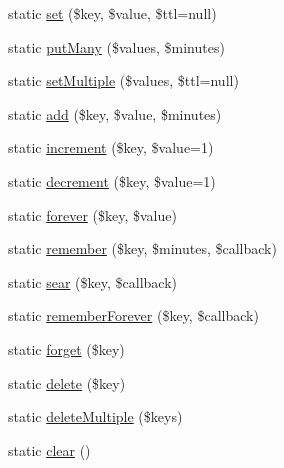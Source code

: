 \begin{DoxyCompactItemize}
\item 
static \mbox{\hyperlink{class_illuminate_1_1_support_1_1_facades_1_1_cache_aae56ae54487230d52f542ccc1e44b9e0}{set}} (\$key, \$value, \$ttl=null)
\item 
static \mbox{\hyperlink{class_illuminate_1_1_support_1_1_facades_1_1_cache_a2e11599beb3fba7bafc407cdf87b0465}{put\+Many}} (\$values, \$minutes)
\item 
static \mbox{\hyperlink{class_illuminate_1_1_support_1_1_facades_1_1_cache_ae003e01cbfd273316452592dac9899cc}{set\+Multiple}} (\$values, \$ttl=null)
\item 
static \mbox{\hyperlink{class_illuminate_1_1_support_1_1_facades_1_1_cache_a5d3c1ec6a3f551739e6c3b360e48e938}{add}} (\$key, \$value, \$minutes)
\item 
static \mbox{\hyperlink{class_illuminate_1_1_support_1_1_facades_1_1_cache_ac922e6a2e98d1e8b294dc4d3988868b8}{increment}} (\$key, \$value=1)
\item 
static \mbox{\hyperlink{class_illuminate_1_1_support_1_1_facades_1_1_cache_a19a2ac21616577006738d270ebf66d1b}{decrement}} (\$key, \$value=1)
\item 
static \mbox{\hyperlink{class_illuminate_1_1_support_1_1_facades_1_1_cache_ad5857aecf260156120fb7cf288c0ae24}{forever}} (\$key, \$value)
\item 
static \mbox{\hyperlink{class_illuminate_1_1_support_1_1_facades_1_1_cache_aaa1f933dcd2732482b7818feb648fb5c}{remember}} (\$key, \$minutes, \$callback)
\item 
static \mbox{\hyperlink{class_illuminate_1_1_support_1_1_facades_1_1_cache_a2cd54fc860d738ed8388d33ee8bd05d4}{sear}} (\$key, \$callback)
\item 
static \mbox{\hyperlink{class_illuminate_1_1_support_1_1_facades_1_1_cache_a2e979a52ee4fdab7288c423516151a7a}{remember\+Forever}} (\$key, \$callback)
\item 
static \mbox{\hyperlink{class_illuminate_1_1_support_1_1_facades_1_1_cache_a95df8d5b2309d9b776fd3572273730b0}{forget}} (\$key)
\item 
static \mbox{\hyperlink{class_illuminate_1_1_support_1_1_facades_1_1_cache_a6a8c952c13ec741d6ce668652c9d42f9}{delete}} (\$key)
\item 
static \mbox{\hyperlink{class_illuminate_1_1_support_1_1_facades_1_1_cache_a9fbf5c08887ab8fec2eeab94a5ea09c3}{delete\+Multiple}} (\$keys)
\item 
static \mbox{\hyperlink{class_illuminate_1_1_support_1_1_facades_1_1_cache_a9928cda1869d6b3ea92ff1da3783ed36}{clear}} ()

\end{DoxyCompactItemize}
